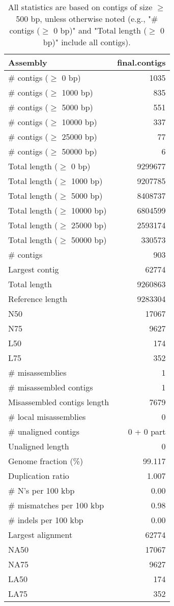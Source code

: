 \documentclass[12pt,a4paper]{article}
\begin{document}
\begin{table}[ht]
\begin{center}
\caption{All statistics are based on contigs of size $\geq$ 500 bp, unless otherwise noted (e.g., "\# contigs ($\geq$ 0 bp)" and "Total length ($\geq$ 0 bp)" include all contigs).}
\begin{tabular}{|l*{1}{|r}|}
\hline
Assembly & final.contigs \\ \hline
\# contigs ($\geq$ 0 bp) & 1035 \\ \hline
\# contigs ($\geq$ 1000 bp) & 835 \\ \hline
\# contigs ($\geq$ 5000 bp) & 551 \\ \hline
\# contigs ($\geq$ 10000 bp) & 337 \\ \hline
\# contigs ($\geq$ 25000 bp) & 77 \\ \hline
\# contigs ($\geq$ 50000 bp) & 6 \\ \hline
Total length ($\geq$ 0 bp) & 9299677 \\ \hline
Total length ($\geq$ 1000 bp) & 9207785 \\ \hline
Total length ($\geq$ 5000 bp) & 8408737 \\ \hline
Total length ($\geq$ 10000 bp) & 6804599 \\ \hline
Total length ($\geq$ 25000 bp) & 2593174 \\ \hline
Total length ($\geq$ 50000 bp) & 330573 \\ \hline
\# contigs & 903 \\ \hline
Largest contig & 62774 \\ \hline
Total length & 9260863 \\ \hline
Reference length & 9283304 \\ \hline
N50 & 17067 \\ \hline
N75 & 9627 \\ \hline
L50 & 174 \\ \hline
L75 & 352 \\ \hline
\# misassemblies & 1 \\ \hline
\# misassembled contigs & 1 \\ \hline
Misassembled contigs length & 7679 \\ \hline
\# local misassemblies & 0 \\ \hline
\# unaligned contigs & 0 + 0 part \\ \hline
Unaligned length & 0 \\ \hline
Genome fraction (\%) & 99.117 \\ \hline
Duplication ratio & 1.007 \\ \hline
\# N's per 100 kbp & 0.00 \\ \hline
\# mismatches per 100 kbp & 0.98 \\ \hline
\# indels per 100 kbp & 0.00 \\ \hline
Largest alignment & 62774 \\ \hline
NA50 & 17067 \\ \hline
NA75 & 9627 \\ \hline
LA50 & 174 \\ \hline
LA75 & 352 \\ \hline
\end{tabular}
\end{center}
\end{table}
\end{document}
